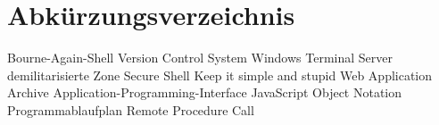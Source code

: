 
\chapter*{Abkürzungsverzeichnis}
\thispagestyle{plain}
\begin{acronym}[YTMMM]
\setlength{\itemsep}{-\parsep}

 {Bourne-Again-Shell}
 {Version Control System}
 {Windows Terminal Server}
 {demilitarisierte Zone}
 {Secure Shell}
 {Keep it simple and stupid}
 {Web Application Archive}
 {Application-Programming-Interface}
 {JavaScript Object Notation}
 {Programmablaufplan}
 {Remote Procedure Call }


 


\end{acronym}
